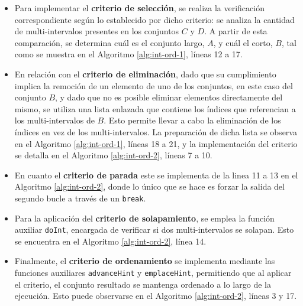 \begin{itemize}
    \item Para implementar el \textbf{criterio de selección}, se realiza la verificación correspondiente según lo establecido por dicho criterio: se analiza la cantidad de multi-intervalos presentes en los conjuntos $C$ y $D$. A partir de esta comparación, se determina cuál es el conjunto largo, $A$, y cuál el corto, $B$, tal como se muestra en el Algoritmo \ref{alg:int-ord-1}, líneas 12 a 17.

    \item En relación con el \textbf{criterio de eliminación}, dado que su cumplimiento implica la remoción de un elemento de uno de los conjuntos, en este caso del conjunto $B$, y dado que no es posible eliminar elementos directamente del mismo, se utiliza una lista enlazada que contiene los índices que referencian a los multi-intervalos de $B$. Esto permite llevar a cabo la eliminación de los índices en vez de los multi-intervalos. La preparación de dicha lista se observa en el Algoritmo \ref{alg:int-ord-1}, líneas 18 a 21, y la implementación del criterio se detalla en el Algoritmo \ref{alg:int-ord-2}, líneas 7 a 10.

    \item En cuanto el \textbf{criterio de parada} este se implementa de la linea 11 a 13 en el Algoritmo \ref{alg:int-ord-2}, donde lo único que se hace es forzar la salida del segundo bucle a través de un \texttt{break}.

    \item Para la aplicación del \textbf{criterio de solapamiento}, se emplea la función auxiliar \texttt{doInt}, encargada de verificar si dos multi-intervalos se solapan. Esto se encuentra en el Algoritmo \ref{alg:int-ord-2}, línea 14.

    \item Finalmente, el \textbf{criterio de ordenamiento} se implementa mediante las funciones auxiliares \texttt{advanceHint} y \texttt{emplaceHint}, permitiendo que al aplicar el criterio, el conjunto resultado se mantenga ordenado a lo largo de la ejecución. Esto puede observarse en el Algoritmo \ref{alg:int-ord-2}, líneas 3 y 17.
\end{itemize}

